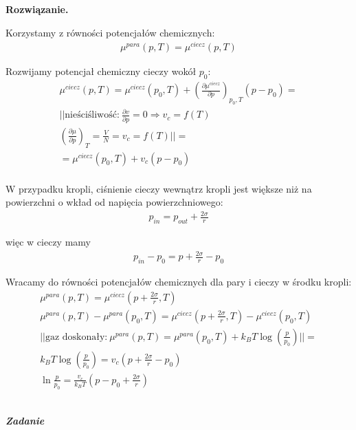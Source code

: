 \documentclass[11pt,a4paper]{article}
\newcounter{zadanie}\newcommand{\zadanie}[1][]{\addtocounter{zadanie}{1} ~\\ {\bf \emph{Zadanie \arabic{zadanie} #1 }} \\}
\newenvironment{solution}{\vspace{1cm} \par\textbf{Rozwiązanie.} \vspace{1cm}}{}
\begin{document}
\begin{solution}

Korzystamy z równości potencjałów chemicznych:
\begin{align*}
  \mu^{para}(p,T) = \mu^{ciecz}(p,T)
\end{align*}

Rozwijamy potencjał chemiczny cieczy wokół $p_0$:
\begin{align*}
  \mu^{ciecz}(p,T) = \mu^{ciecz}(p_0,T) + \left( \frac{\partial \mu^{ciecz}}{\partial p} \right)_{p_0,T} (p - p_0) = \\
  || \text{nieściśliwość:}~\frac{\partial v}{\partial p} = 0 \Rightarrow v_c = f(T) \\
     \left(\frac{\partial \mu }{\partial p} \right)_{T} = \frac{V}{N} = v_c = f(T)|| = \\
    = \mu^{ciecz}(p_0,T) + v_c(p - p_0) \\
\end{align*}

W przypadku kropli, ciśnienie cieczy wewnątrz kropli jest większe niż na powierzchni
o wkład od napięcia powierzchniowego:
\begin{align*}
p_{in} = p_{out} + \frac{2\sigma}{r}
\end{align*}

więc w cieczy mamy
\begin{align*}
  p_{in} - p_0 = p + \frac{2\sigma}{r} - p_0
\end{align*}

Wracamy do równości potencjałów chemicznych dla pary i cieczy w środku kropli:
\begin{align*}
  \mu^{para}(p,T) = \mu^{ciecz}(p + \frac{2\sigma}{r},T) \\
  \mu^{para}(p,T) - \mu^{para}(p_0,T) = \mu^{ciecz}(p + \frac{2\sigma}{r},T) - \mu^{ciecz}(p_0,T) \\
  || \text{gaz doskonały:}~\mu^{para}(p,T) = \mu^{para}(p_0,T) + k_B T \log\left( \frac{p}{p_0} \right) || = \\
  k_B T \log\left( \frac{p}{p_0} \right) = v_c\left(p + \frac{2\sigma}{r} - p_0\right) \\
  \ln\frac{p}{p_0} = \frac{v_c}{k_B T}\left(p - p_0 + \frac{2\sigma}{r}\right)
\end{align*}

\newpage   
\end{solution}
\zadanie[]
\end{document}
